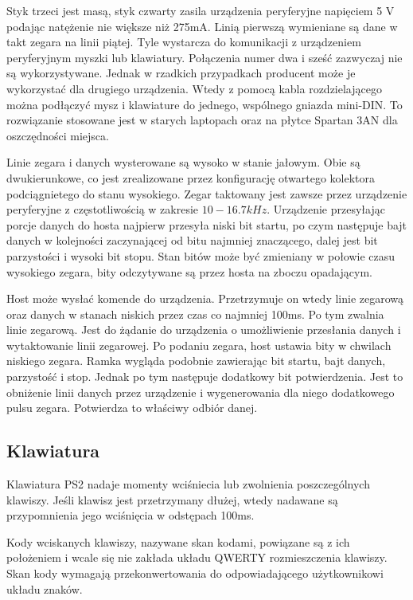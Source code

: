\documentclass[a4paper,12pt]{article}
\begin{document}
Styk trzeci jest masą, styk czwarty zasila urządzenia peryferyjne napięciem 5 V podając natężenie nie większe niż 275mA. Linią pierwszą wymieniane są dane w takt zegara na linii piątej. Tyle wystarcza do komunikacji z urządzeniem peryferyjnym myszki lub klawiatury. Połączenia numer dwa i sześć zazwyczaj nie są wykorzystywane. Jednak w rzadkich przypadkach producent może je wykorzystać dla drugiego urządzenia. Wtedy z pomocą kabla rozdzielającego można podłączyć mysz i klawiature do jednego, wspólnego gniazda mini-DIN. To rozwiązanie stosowane jest w starych laptopach oraz na płytce Spartan 3AN dla oszczędności miejsca.

Linie zegara i danych wysterowane są wysoko w stanie jałowym. Obie są dwukierunkowe, co jest zrealizowane przez konfigurację otwartego kolektora podciągnietego do stanu wysokiego. Zegar taktowany jest zawsze przez urządzenie peryferyjne z częstotliwością w zakresie $10 - 16.7 kHz$. Urządzenie przesyłając porcje danych do hosta najpierw przesyła niski bit startu, po czym następuje bajt danych w kolejności zaczynającej od bitu najmniej znaczącego, dalej jest bit parzystości i wysoki bit stopu. Stan bitów może być zmieniany w połowie czasu wysokiego zegara, bity odczytywane są przez hosta na zboczu opadającym.

Host może wysłać komende do urządzenia. Przetrzymuje on wtedy linie zegarową oraz danych w stanach niskich przez czas co najmniej 100ms. Po tym zwalnia linie zegarową. Jest do żądanie do urządzenia o umożliwienie przesłania danych i wytaktowanie linii zegarowej. Po podaniu zegara, host ustawia bity w chwilach niskiego zegara. Ramka wygląda podobnie zawierając bit startu, bajt danych, parzystość i stop. Jednak po tym następuje dodatkowy bit potwierdzenia. Jest to obniżenie linii danych przez urządzenie i wygenerowania dla niego dodatkowego pulsu zegara. Potwierdza to właściwy odbiór danej.

\subsection{Klawiatura}

Klawiatura PS2 nadaje momenty wciśniecia lub zwolnienia poszczególnych klawiszy. Jeśli klawisz jest przetrzymany dłużej, wtedy nadawane są przypomnienia jego wciśnięcia w odstępach 100ms.

Kody wciskanych klawiszy, nazywane skan kodami, powiązane są z ich położeniem i wcale się nie zakłada układu QWERTY rozmieszczenia klawiszy. Skan kody wymagają przekonwertowania do odpowiadającego użytkownikowi układu znaków.
\end{document}
